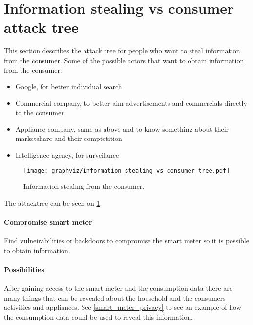\section{Information stealing vs consumer attack tree}
This section describes the attack tree for people who want to steal information from the consumer.
Some of the possible actors that want to obtain information from the consumer:
\begin{itemize}
\item Google, for better individual search
\item Commercial company, to better aim advertisements and commercials directly to the consumer
\item Appliance company, same as above and to know something about their marketshare and their comptetition
\item Intelligence agency, for surveilance
\end{itemize}

\begin{figure}
  \begin{center}
    \texttt{[image: graphviz/information\_stealing\_vs\_consumer\_tree.pdf]}
  \end{center}
  \caption{Information stealing from the consumer.}
  \label{information_stealing_tree}
\end{figure}

The attacktree can be seen on \cref{information_stealing_tree}.

\paragraph{Compromise smart meter}
Find vulneirabilities or backdoors to compromise the smart meter so it is possible to obtain information.

\paragraph{Possibilities}
After gaining access to the smart meter and the consumption data there are many things that can be revealed about the household and the consumers activities and appliances.
See \cref{smart_meter_privacy} to see an example of how the consumption data could be used to reveal this information.
